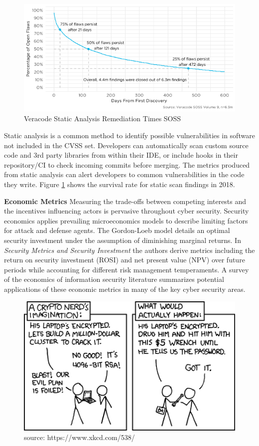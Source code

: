 \begin{figure}[ht]
\centering
\includegraphics[width=.9\linewidth]{resource/img/ch_intro/veracode_closures_survival_analysis.png}
\caption{Veracode Static Analysis Remediation Times SOSS \cite{soss_v9}}
\label{fig:intro:soss-survival}
\end{figure} 


Static analysis\cite{Basili_Briand_Melo_1996} is a common method to identify possible vulnerabilities in software not included in the CVSS set. Developers can automatically scan custom source code and 3rd party libraries from within their IDE, or include hooks in their repository/CI to check incoming commits before merging. The metrics produced from static analysis can alert developers\cite{Johnson_2013} to common vulnerabilities in the code they write.  Figure \ref{fig:intro:soss-survival} shows the survival rate for static scan findings in 2018. 



\textbf{Economic Metrics} Measuring the trade-offs between competing interests and the incentives influencing actors is pervasive throughout cyber security. Security economics\cite{Anderson_2001} applies prevailing microeconomics models to describe limiting factors for attack and defense agents. The Gordon-Loeb\cite{Gordon_Loeb} model details an optimal security investment under the assumption of diminishing marginal returns.  In \textit{Security Metrics and Security Investment}\cite{Bohme_Moore} the authors derive metrics including the return on security investment (ROSI) and net present value (NPV) over future periods while accounting for different risk management temperaments. A survey of the economics of information security\cite{Anderson_Moore} literature summarizes potential applications of these economic metrics in many of the key cyber security areas. 


\begin{figure}[ht]
\centering
\includegraphics[width=.6\linewidth]{resource/img/ch_intro/xkcd_538_threat_model_econsec.png}
\caption{ source: https://www.xkcd.com/538/ }
\label{fig:intro:xkcd}
\end{figure} 

